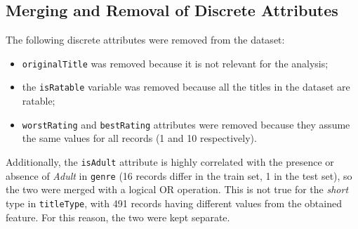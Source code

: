 \subsection{Merging and Removal of Discrete Attributes}\label{subsec:var_elim_discrete}
The following discrete attributes were removed from the dataset:
\begin{itemize}
    \item \texttt{originalTitle} was removed because it is not relevant for the analysis;
    \item the \texttt{isRatable} variable was removed because all the titles in the dataset are ratable;
    \item \texttt{worstRating} and \texttt{bestRating} attributes were removed because they assume the same values for all records (1 and 10 respectively).
\end{itemize}

Additionally, the \texttt{isAdult} attribute is highly correlated with the presence or absence of
\textit{Adult} in \texttt{genre} (16 records differ in the train set, 1 in the test set), so the two were
merged with a logical OR operation. This is not true for the \textit{short} type in \texttt{titleType}, with
491 records having different values from the obtained feature. For this reason, the two were kept separate.



